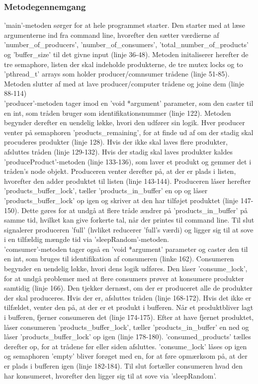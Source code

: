\subsubsection{Metodegennemgang}
\label{O3_Metoder}
'main'-metoden sørger for at hele programmet starter. Den starter med at læse argumenterne ind fra command line, hvorefter den sætter værdierne af 'number_of_producers', 'number_of_consumers', 'total_number_of_products' og 'buffer_size' til det givne input (linje 36-48). Metoden initaliserer herefter de tre semaphore, listen der skal indeholde produkterne, de tre mutex locks og to 'pthread_t' arrays som holder producer/comnsumer trådene (linje 51-85). Metoden slutter af med at lave producer/computer trådene og joine dem (linje 88-114)
\\ 'producer'-metoden tager imod en 'void *argument' parameter, som den caster til en int, som tråden bruger som identifikationsnummer (linje 122). Metoden begynder derefter en uendelig løkke, hvori den udfører sin logik. Hver producer venter på semaphoren 'products_remaining', for at finde ud af om der stadig skal procuderes produkter (linje 128). Hvis der ikke skal laves flere produkter, afsluttes tråden (linje 129-132). Hvis der stadig skal laves produkter kaldes 'produceProduct'-metoden (linje 133-136), som laver et produkt og gemmer det i tråden's node objekt. Produceren venter derefter på, at der er plads i listen, hvorefter den adder produktet til listen (linje 143-144). Produceren låser herefter 'products_buffer_lock', tæller 'products_in_buffer' en op og låser 'products_buffer_lock' op igen og skriver at den har tilføjet produktet (linje 147-150). Dette gøres for at undgå at flere tråde ændrer på 'products_in_buffer' på samme tid, hvilket kan give forkerte tal, når der printes til command line. Til slut signalerer produceren 'full' (hvliket reducerer 'full's værdi) og ligger sig til at sove i en tilfældig mængde tid via 'sleepRandom'-metoden.
\\ 'comsumer'-metoden tager også en 'void *argument' parameter og caster den til en int, som bruges til identifikation af consumeren (linke 162). Consumeren begynder en uendelig løkke, hvori dens logik udføres. Den låser 'consume_lock', for at undgå problemer med at flere consumers prøver at konsumere produkter samtidig (linje 166). Den tjekker dernæst, om der er produceret alle de produkter der skal produceres. Hvis der er, afsluttes tråden (linje 168-172). Hvis det ikke er tilfældet, venter den på, at der er et produkt i bufferen. Når et produktbliver lagt i bufferen, fjerner consumeren det (linje 174-175). Efter at have fjernet produktet, låser consumeren 'products_buffer_lock', tæller 'products_in_buffer' en ned og låser 'products_buffer_lock' op igen (linje 178-180). 'consumed_products' tælles derefter op, for at trådene før eller siden afsluttes. 'consume_lock' låses op igen og semaphoren 'empty' bliver forøget med en, for at føre opmærksom på, at der er plads i bufferen igen (linje 182-184). Til slut fortæller consumeren hvad den har konsumeret, hvorefter den ligger sig til at sove via 'sleepRandom'.
